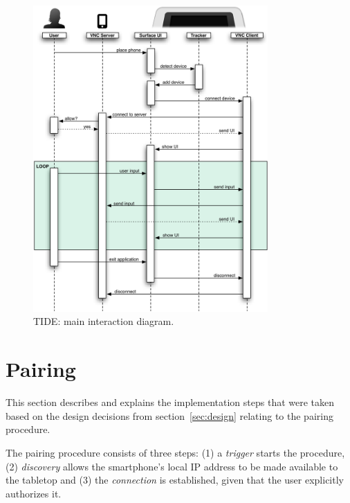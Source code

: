 \begin{figure}[htb]
  \centering
    \includegraphics[width=0.8\textwidth]{images/sequenceOverview}
    \caption{TIDE: main interaction diagram.}
    \label{fig:sequenceOverview}
\end{figure}



\section{Pairing}
\label{sec:pairing}

This section describes and explains the implementation steps that were taken based on the design decisions from section~\ref{sec:design} relating to the pairing procedure.


The pairing procedure consists of three steps:
(1) a \emph{trigger} starts the procedure,
(2) \emph{discovery} allows the smartphone's local IP address to be made available to the tabletop and
(3) the \emph{connection} is established, given that the user explicitly authorizes it.

